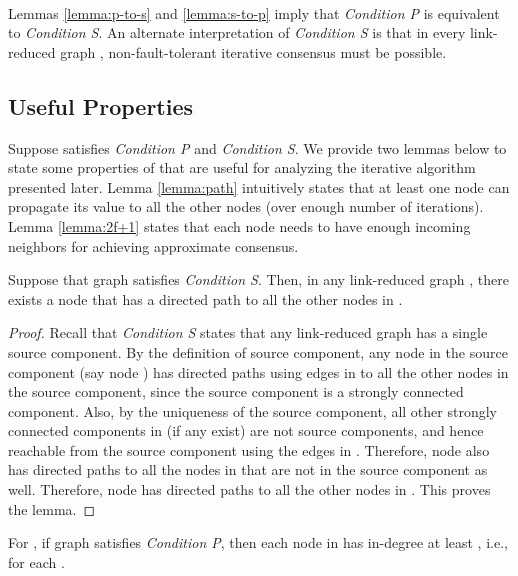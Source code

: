 \documentclass{llncs}
\newcommand{\fillbox}{\hspace*{\fill}}
\begin{document}
~

Lemmas \ref{lemma:p-to-s} and \ref{lemma:s-to-p} imply that {\em Condition P} is equivalent to {\em Condition S}. An alternate interpretation of {\em Condition S} is that in every link-reduced graph , non-fault-tolerant iterative consensus must be possible.



\subsection{Useful Properties}
\label{s:useful}

Suppose  satisfies {\em Condition P} and {\em Condition S}. We provide two lemmas below to state some properties of  that are useful for analyzing the iterative algorithm presented later. Lemma \ref{lemma:path} intuitively states that at least one node can propagate its value to all the other nodes (over enough number of iterations). Lemma \ref{lemma:2f+1} states that each node needs to have enough incoming neighbors for achieving approximate consensus. 

\begin{lemma}
\label{lemma:path}
Suppose that graph  satisfies {\em Condition S}. Then, in any link-reduced graph , there exists a node that has a directed path to all the other nodes in .
\end{lemma}


\begin{proof}
Recall that {\em Condition S} states that any link-reduced graph  has a single source component. By the definition of source component, any node in the source component (say node ) has directed paths using edges in  to all the other nodes in the source component, since the source component is a strongly connected component. Also, by the uniqueness of the source component, all other strongly connected components in  (if any exist) are not source components, and hence reachable from the source component using the edges in . Therefore, node  also has directed paths to all the nodes in  that are not in the source component as well. Therefore, node  has directed paths to all the other nodes in . This proves the lemma.
\fillbox
\end{proof}



\begin{lemma}
\label{lemma:2f+1}
For , if graph  satisfies {\em Condition P}, then each node in  has in-degree at least , i.e., for each .
\end{lemma}
\end{document}
